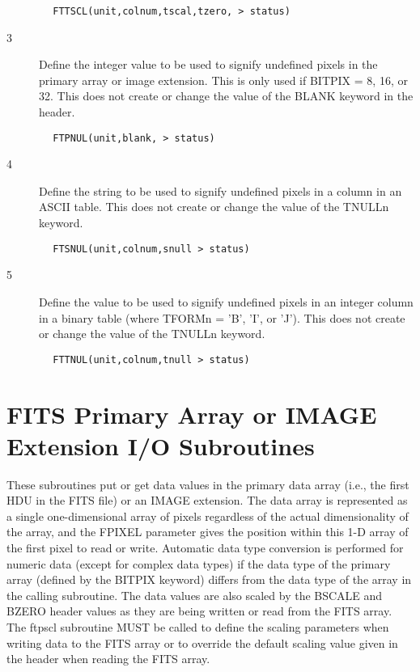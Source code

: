\documentclass[11pt]{book}
\begin{document}
\begin{verbatim}
        FTTSCL(unit,colnum,tscal,tzero, > status)
\end{verbatim}

\begin{description}
\item[3 ] Define the integer value to be used to signify undefined pixels in the
    primary array or image extension.  This is only used if BITPIX = 8, 16,
    or 32.  This does not create or change the value of the BLANK keyword in
   the header.
\end{description}

\begin{verbatim}
        FTPNUL(unit,blank, > status)
\end{verbatim}

\begin{description}
\item[4 ] Define the string to be used to signify undefined pixels in
    a column in an ASCII table.  This does not create or change the value
   of the TNULLn keyword.
\end{description}

\begin{verbatim}
        FTSNUL(unit,colnum,snull > status)
\end{verbatim}

\begin{description}
\item[5 ] Define the value to be used to signify undefined pixels in
    an integer column in a binary table (where TFORMn = 'B', 'I', or 'J').
   This does not create or  change the value of the TNULLn keyword.
\end{description}

\begin{verbatim}
        FTTNUL(unit,colnum,tnull > status)
\end{verbatim}


\section{FITS Primary Array or IMAGE Extension I/O Subroutines \label{FTPPR}}

    These subroutines put or get data values in the primary data array
(i.e., the first HDU in the FITS file) or an IMAGE extension.  The
data array is represented as a single one-dimensional array of
pixels regardless of the actual dimensionality of the array, and the
FPIXEL parameter gives the position within this 1-D array of the first
pixel to read  or write.  Automatic data type conversion is performed
for numeric data (except for complex data types) if the data type of
the primary array (defined by the BITPIX keyword) differs from the data
type of the array in the calling subroutine.  The data values are also
scaled by the BSCALE and BZERO header values as they are being written
or read from the FITS array.  The ftpscl subroutine MUST be
called to define the scaling parameters when writing data to the FITS
array or to override the default scaling value given in the header when
reading the FITS array.
\end{document}
